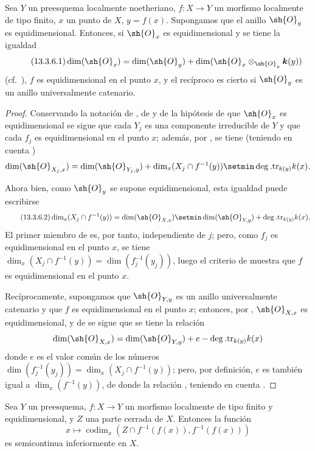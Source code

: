 \begin{proposition}[13.3.6]
\label{IV.13.3.6}
Sea $Y$ un preesquema localmente noetheriano, $f:X\to Y$ un morfismo localmente de tipo finito, $x$ un punto de $X$, $y=f(x)$.
Supongamos que el anillo $\sh{O}_y$ es equidimensional. Entonces, si $\sh{O}_x$ es equidimensional y se tiene la igualdad
\[
\tag{13.3.6.1}
\label{IV.13.3.6.1}
  \dim(\sh{O}_x)=\dim(\sh{O}_y)+\dim(\sh{O}_x\otimes_{\sh{O}_y}\boldsymbol k(y))
\]
(cf.\ ), $f$ es equidimensional en el punto $x$, y el recíproco es cierto si $\sh{O}_y$ es un anillo universalmente catenario.
\end{proposition}

\begin{proof}
Conservando la notación de , de  y de la hipótesis de que $\sh{O}_x$ es equidimensional se sigue que cada $Y_j$ es una componente irreducible de $Y$ y que cada $f_j$ es equidimensional en el punto $x$; además, por , se tiene (teniendo en cuenta )
\[
  \dim(\sh{O}_{X_j,x})=\dim(\sh{O}_{Y_j,y})+\dim_x(X_j\cap f^{-1}(y))\setmin\deg.\mathrm{tr}_{k(y)}k(x).
\]


Ahora bien, como $\sh{O}_y$ se supone equidimensional, esta igualdad puede escribirse
\[
\tag{13.3.6.2}
\label{IV.13.3.6.2}
  \dim_x(X_j\cap f^{-1}(y))=\dim(\sh{O}_{X,x})\setmin\dim(\sh{O}_{Y,y})+\deg.\mathrm{tr}_{k(y)}k(x).
\]
El primer miembro de  es, por tanto, independiente de $j$; pero, como $f_j$ es equidimensional en el punto $x$, se tiene $\dim_x(X_j\cap f^{-1}(y))=\dim(f_j^{-1}(y_j))$, luego el criterio de  muestra que $f$ es equidimensional en el punto $x$.

Recíprocamente, supongamos que $\sh{O}_{Y,y}$ es un anillo universalmente catenario y que $f$ es equidimensional en el punto $x$; entonces, por , $\sh{O}_{X,x}$ es equidimensional, y de  se sigue que se tiene la relación
\[
  \dim(\sh{O}_{X,x})=\dim(\sh{O}_{Y,y})+e-\deg.\mathrm{tr}_{k(y)}k(x)
\]
donde $e$ es el valor común de los números $\dim(f_j^{-1}(y_j))=\dim_x(X_j\cap f^{-1}(y))$; pero, por definición, $e$ es también igual a $\dim_x(f^{-1}(y))$, de donde la relación , teniendo en cuenta .
\end{proof}

\begin{proposition}[13.3.7]
\label{IV.13.3.7}
Sea $Y$ un preesquema, $f:X\to Y$ un morfismo localmente de tipo finito y equidimensional, y $Z$ una parte cerrada de $X$.
Entonces la función
\[
\label{IV.13.3.7.1}
\tag{13.3.7.1}
  x\mapsto\operatorname{codim}_x(Z\cap f^{-1}(f(x)),f^{-1}(f(x)))
\]
es semicontinua inferiormente en $X$.
\end{proposition}

